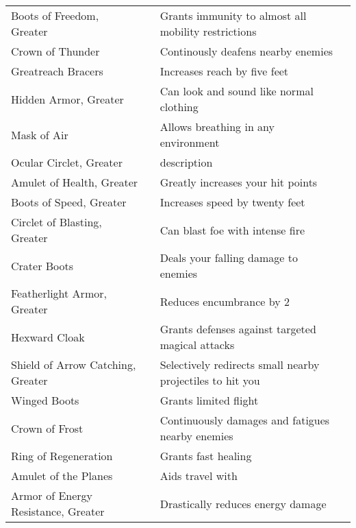 \begin{longtabuwrapper}
\begin{longtabu}{l l X l}
Boots of Freedom, Greater &  & Grants immunity to almost all mobility restrictions & \pageref{item:Boots of Freedom, Greater} \\
Crown of Thunder &  & Continously deafens nearby enemies & \pageref{item:Crown of Thunder} \\
Greatreach Bracers &  & Increases reach by five feet & \pageref{item:Greatreach Bracers} \\
Hidden Armor, Greater &  & Can look and sound like normal clothing & \pageref{item:Hidden Armor, Greater} \\
Mask of Air &  & Allows breathing in any environment & \pageref{item:Mask of Air} \\
Ocular Circlet, Greater &  & description & \pageref{item:Ocular Circlet, Greater} \\
Amulet of Health, Greater &  & Greatly increases your hit points & \pageref{item:Amulet of Health, Greater} \\
Boots of Speed, Greater &  & Increases speed by twenty feet & \pageref{item:Boots of Speed, Greater} \\
Circlet of Blasting, Greater &  & Can blast foe with intense fire & \pageref{item:Circlet of Blasting, Greater} \\
Crater Boots &  & Deals your falling damage to enemies & \pageref{item:Crater Boots} \\
Featherlight Armor, Greater &  & Reduces encumbrance by 2 & \pageref{item:Featherlight Armor, Greater} \\
Hexward Cloak &  & Grants  defenses against targeted magical attacks & \pageref{item:Hexward Cloak} \\
Shield of Arrow Catching, Greater &  & Selectively redirects small nearby projectiles to hit you & \pageref{item:Shield of Arrow Catching, Greater} \\
Winged Boots &  & Grants limited flight & \pageref{item:Winged Boots} \\
Crown of Frost &  & Continuously damages and fatigues nearby enemies & \pageref{item:Crown of Frost} \\
Ring of Regeneration &  & Grants fast healing & \pageref{item:Ring of Regeneration} \\
Amulet of the Planes &  & Aids travel with  & \pageref{item:Amulet of the Planes} \\
Armor of Energy Resistance, Greater &  & Drastically reduces energy damage & \pageref{item:Armor of Energy Resistance, Greater} \\

\end{longtabu}
\end{longtabuwrapper}
